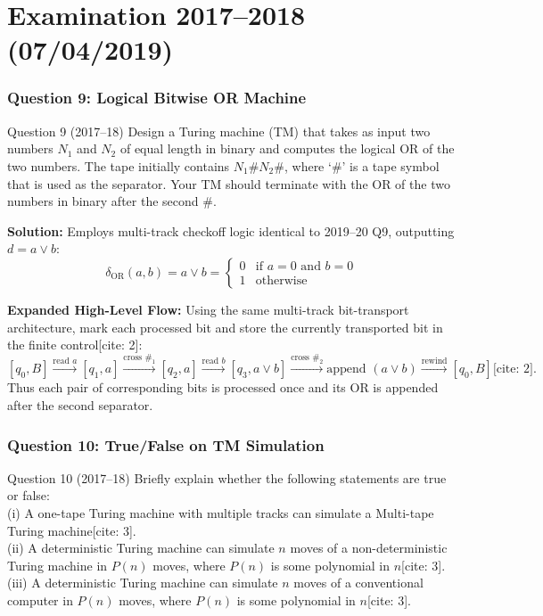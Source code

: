\documentclass[11pt,a4paper]{article}
\begin{document}
\part{Examination 2017--2018 (07/04/2019)}

\section{Question 9: Logical Bitwise OR Machine}
\begin{questionbox}{Question 9 (2017--18)}
Design a Turing machine (TM) that takes as input two numbers $N_1$ and $N_2$ of equal length in binary and computes the logical OR of the two numbers. The tape initially contains $N_1 \# N_2 \#$, where `\#' is a tape symbol that is used as the separator. Your TM should terminate with the OR of the two numbers in binary after the second \#.
\end{questionbox}

\begin{solutionbox}
\textbf{Solution:} Employs multi-track checkoff logic identical to 2019--20 Q9, outputting $d = a \lor b$:
$$\delta_{\text{OR}}(a, b) = a \lor b = \begin{cases} 0 & \text{if } a=0 \text{ and } b=0 \\ 1 & \text{otherwise} \end{cases}$$

\textbf{Expanded High-Level Flow:}
Using the same multi-track bit-transport architecture, mark each processed bit and store the currently transported bit in the finite control[cite: 2]:
$$[q_0,B]\xrightarrow{\text{read }a}[q_1,a]
\xrightarrow{\text{cross }\#_1}[q_2,a]
\xrightarrow{\text{read }b}[q_3,a\lor b]
\xrightarrow{\text{cross }\#_2}\text{append }(a\lor b)
\xrightarrow{\text{rewind}}[q_0,B]\text{[cite: 2]}.$$
Thus each pair of corresponding bits is processed once and its OR is appended after the second separator.
\end{solutionbox}

\section{Question 10: True/False on TM Simulation}
\begin{questionbox}{Question 10 (2017--18)}
Briefly explain whether the following statements are true or false: \\
(i) A one-tape Turing machine with multiple tracks can simulate a Multi-tape Turing machine[cite: 3]. \\
(ii) A deterministic Turing machine can simulate $n$ moves of a non-deterministic Turing machine in $P(n)$ moves, where $P(n)$ is some polynomial in $n$[cite: 3]. \\
(iii) A deterministic Turing machine can simulate $n$ moves of a conventional computer in $P(n)$ moves, where $P(n)$ is some polynomial in $n$[cite: 3].
\end{questionbox}
\end{document}
